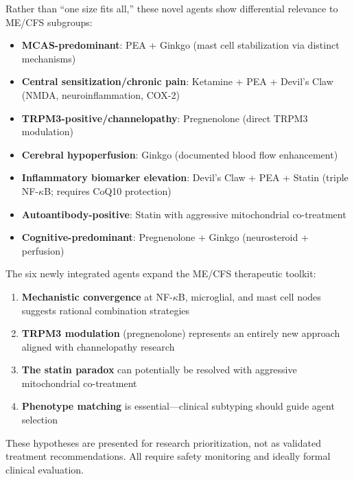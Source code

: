 Rather than ``one size fits all,'' these novel agents show differential relevance to ME/CFS subgroups:

\begin{itemize}
    \item \textbf{MCAS-predominant}: PEA + Ginkgo (mast cell stabilization via distinct mechanisms)
    \item \textbf{Central sensitization/chronic pain}: Ketamine + PEA + Devil's Claw (NMDA, neuroinflammation, COX-2)
    \item \textbf{TRPM3-positive/channelopathy}: Pregnenolone (direct TRPM3 modulation)
    \item \textbf{Cerebral hypoperfusion}: Ginkgo (documented blood flow enhancement)
    \item \textbf{Inflammatory biomarker elevation}: Devil's Claw + PEA + Statin (triple NF-$\kappa$B; requires CoQ10 protection)
    \item \textbf{Autoantibody-positive}: Statin with aggressive mitochondrial co-treatment
    \item \textbf{Cognitive-predominant}: Pregnenolone + Ginkgo (neurosteroid + perfusion)
\end{itemize}

\begin{keypoint}
The six newly integrated agents expand the ME/CFS therapeutic toolkit:
\begin{enumerate}
    \item \textbf{Mechanistic convergence} at NF-$\kappa$B, microglial, and mast cell nodes suggests rational combination strategies
    \item \textbf{TRPM3 modulation} (pregnenolone) represents an entirely new approach aligned with channelopathy research
    \item \textbf{The statin paradox} can potentially be resolved with aggressive mitochondrial co-treatment
    \item \textbf{Phenotype matching} is essential---clinical subtyping should guide agent selection
\end{enumerate}
These hypotheses are presented for research prioritization, not as validated treatment recommendations. All require safety monitoring and ideally formal clinical evaluation.
\end{keypoint}


